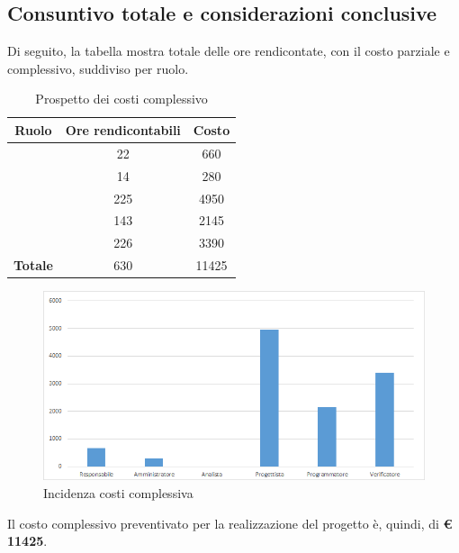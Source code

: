 \subsection{Consuntivo totale e considerazioni conclusive}

Di seguito, la tabella mostra totale delle ore rendicontate, con il costo parziale e complessivo, suddiviso per ruolo. 

\begin{table}[H]
	\begin{center}
		\begin{tabular}{|c|c|c|}
			\hline
			\textbf{Ruolo}	& \textbf{Ore rendicontabili} & \textbf{Costo} \\
			\hline
			\Res	&	22  &	660	\\
			\hline
			\Amm	&	14  &	280	\\
			\hline
			\Prog	&	225  &	4950	\\
			\hline
			\Progr	&	143  &	2145	\\
			\hline
			\Ver	&	226  &	3390	\\
			\hline
			\textbf{Totale}  &	630  &	11425	\\
			\hline
		\end{tabular}
	\end{center}
	\caption{Prospetto dei costi complessivo}
\end{table}

\begin{figure}[H]
	\centering
	\includegraphics[scale=0.6]{img/8-6.png}
	\caption{Incidenza costi complessiva}
\end{figure}

Il costo complessivo preventivato per la realizzazione del progetto è, quindi, di \textbf{€ 11425}.